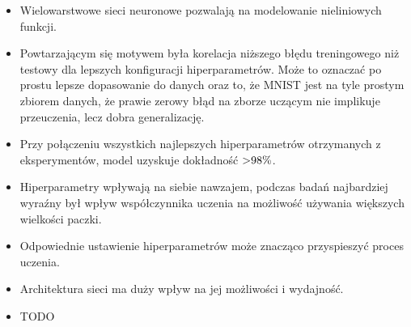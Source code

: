\documentclass{article}
\begin{document}
\begin{itemize}
	\item Wielowarstwowe sieci neuronowe pozwalają na modelowanie nieliniowych funkcji.
	\item Powtarzającym się motywem była korelacja niższego błędu treningowego niż testowy dla lepszych konfiguracji hiperparametrów. Może to oznaczać po prostu lepsze dopasowanie do danych oraz to, że MNIST jest na tyle prostym zbiorem danych, że prawie zerowy błąd na zborze uczącym nie implikuje przeuczenia, lecz dobra generalizację.
	\item Przy połączeniu wszystkich najlepszych hiperparametrów otrzymanych z eksperymentów, model uzyskuje dokładność \($>98\%$\).
	\item Hiperparametry wpływają na siebie nawzajem, podczas badań najbardziej wyraźny był wpływ współczynnika uczenia na możliwość używania większych wielkości paczki.
	\item Odpowiednie ustawienie hiperparametrów może znacząco przyspieszyć proces uczenia.
	\item Architektura sieci ma duży wpływ na jej możliwości i wydajność.
	\item TODO
\end{itemize}
\end{document}
